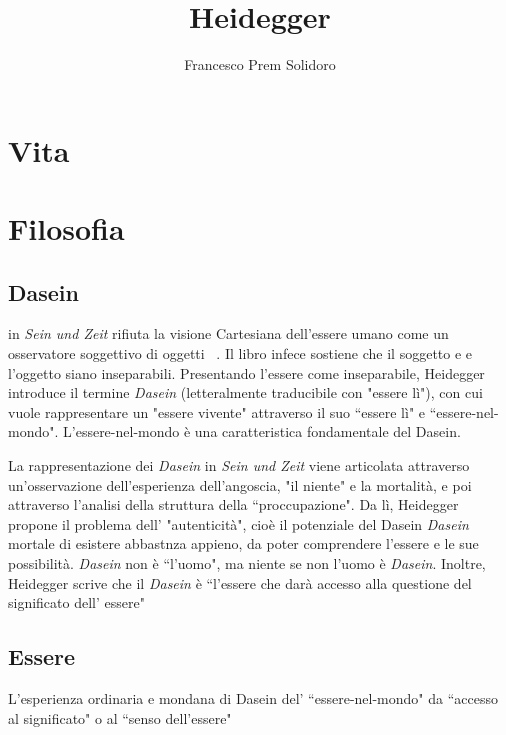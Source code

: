 \documentclass{article}
\title{Heidegger}
\author{Francesco Prem Solidoro}
\begin{document}
\maketitle
\tableofcontents
\section{Vita} %
\label{sec:VIta}

\section{Filosofia} %
\label{sec:Filosofia}
\subsection{Dasein} %
\label{sub:Dasein}
\textcite{sein_und_zeit_heidegger} in \textit{Sein und Zeit} rifiuta la visione Cartesiana dell'essere umano come un osservatore soggettivo di oggetti ~\cite{Horrigan-Kelly_Heidegger}. Il libro infece sostiene che il soggetto e e l'oggetto siano inseparabili. Presentando l'essere come inseparabile, Heidegger introduce il termine \textit{Dasein} (letteralmente traducibile con "essere lì"), con cui vuole rappresentare un "essere vivente" attraverso il suo ``essere lì" e ``essere-nel-mondo". L'essere-nel-mondo è una caratteristica fondamentale del Dasein.

La rappresentazione dei \textit{Dasein} in \textit{Sein und Zeit} viene articolata attraverso un'osservazione dell'esperienza dell'angoscia, "il niente" e la mortalità, e poi attraverso l'analisi della struttura della ``proccupazione". Da lì, Heidegger propone il problema dell' "autenticità", cioè il potenziale del Dasein \textit{Dasein} mortale di esistere abbastnza appieno, da poter comprendere l'essere e le sue possibilità. \textit{Dasein} non è ``l'uomo", ma niente se non l'uomo è \textit{Dasein}. Inoltre, Heidegger scrive che il \textit{Dasein} è ``l'essere che darà accesso alla questione del significato dell' essere" ~\cite{Peter_caws_Heidegger_Sartre}

\subsection{Essere} %
\label{sub:Essere}
L'esperienza ordinaria e mondana di Dasein del' ``essere-nel-mondo" da ``accesso al significato" o al ``senso dell'essere" 



\printbibliography
\end{document}
